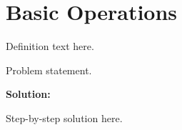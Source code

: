 \section{Basic Operations}


\begin{definition}[Term]
Definition text here.
\end{definition}

\begin{example}
Problem statement.

\textbf{Solution:}

Step-by-step solution here.
\end{example}
